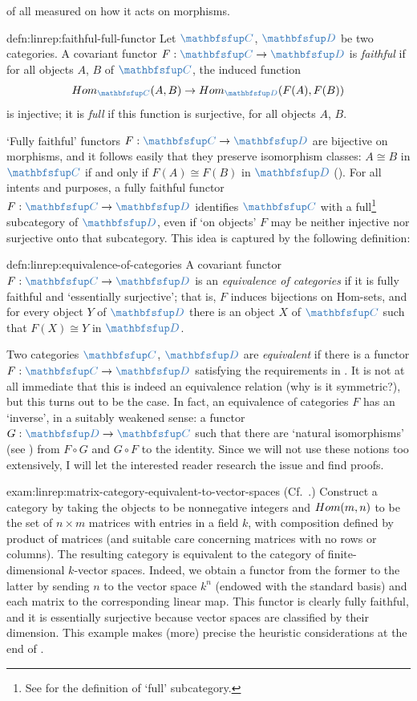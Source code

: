of all measured on how it acts on morphisms.
\begin{defn}{}{defn:linrep:faithful-full-functor}
  Let $\categ{C}$, $\categ{D}$ be two categories. A covariant functor
  $F : \categ{C} \to \categ{D}$ is \emph{faithful} if for all objects
  $A$, $B$ of $\categ{C}$, the induced function
  \[
    \Hom_{\categ{C}}(A, B) \to \Hom_{\categ{D}}(F(A), F(B))
  \]
  is injective; it is \emph{full} if this function is surjective, for
  all objects $A$, $B$.
\end{defn}
`Fully faithful' functors $F : \categ{C} \to \categ{D}$ are bijective
on morphisms, and it follows easily that they preserve isomorphism
classes: $A \cong B$ in $\categ{C}$ if and only if $F(A) \cong F(B)$
in $\categ{D}$ (). For
all intents and purposes, a fully faithful functor
$F : \categ{C} \to \categ{D}$ identifies $\categ{C}$ with a
full\footnote{See  for the definition of
  `full' subcategory.} subcategory of $\categ{D}$, even if `on
objects' $F$ may be neither injective nor surjective onto that
subcategory. This idea is captured by the following definition:
\begin{defn}{}{defn:linrep:equivalence-of-categories}
  A covariant functor $F : \categ{C} \to \categ{D}$ is an
  \emph{equivalence of categories} if it is fully faithful and
  `essentially surjective'; that is, $F$ induces bijections on
  Hom-sets, and for every object $Y$ of $\categ{D}$ there is an object
  $X$ of $\categ{C}$ such that $F(X) \cong Y$ in $\categ{D}$.
\end{defn}
Two categories $\categ{C}$, $\categ{D}$ are \emph{equivalent} if there
is a functor $F : \categ{C} \to \categ{D}$ satisfying the requirements
in . It is not at all immediate that this is indeed
an equivalence relation (why is it symmetric?), but this turns out to
be the case. In fact, an equivalence of categories $F$ has an
`inverse', in a suitably weakened sense: a functor
$G : \categ{D} \to \categ{C}$ such that there are `natural
isomorphisms' (see ) from
$F \circ G$ and $G \circ F$ to the identity. Since we will not use
these notions too extensively, I will let the interested reader
research the issue and find proofs.
\begin{exam}{}{exam:linrep:matrix-category-equivalent-to-vector-spaces}
  (Cf.\ .) Construct a category by
  taking the objects to be nonneg\-ative integers and $Hom(m, n)$ to
  be the set of $n \times m$ matrices with entries in a field $k$,
  with composition defined by product of matrices (and suitable care
  concerning matrices with no rows or columns). The resulting category
  is equivalent to the category of finite-dimensional $k$-vector
  spaces. Indeed, we obtain a functor from the former to the latter by
  sending $n$ to the vector space $k^n$ (endowed with the standard
  basis) and each matrix to the corresponding linear map. This functor
  is clearly fully faithful, and it is essentially surjective because
  vector spaces are classified by their dimension. This example makes
  (more) precise the heuristic considerations at the end of
  .
\end{exam}
